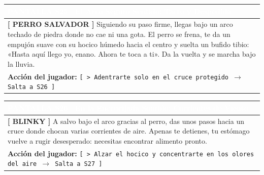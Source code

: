 \documentclass[11pt, a4paper]{article}
\begin{document}
\vspace{1em}

\noindent
\begin{tabularx}{\textwidth}{|X|}
\hline
\rowcolor{colorHeader}
\textbf{\textcolor{white}{PANTALLA S25 $\cdot$ El Arco Seguro}} \hfill \small\textcolor{white}{Sentido: Tacto y Despedida} \\ \hline
\rowcolor{colorTextoBox}
\textbf{\textcolor{colorEmisor}{[ PERRO SALVADOR ]}} \vspace{0.2em}\newline
Siguiendo su paso firme, llegas bajo un arco techado de piedra donde no cae ni una gota. El perro se frena, te da un empujón suave con su hocico húmedo hacia el centro y suelta un bufido tibio: «Hasta aquí llego yo, enano. Ahora te toca a ti». Da la vuelta y se marcha bajo la lluvia. \\ \hline
\rowcolor{colorBotonBox}
\textbf{Acción del jugador:} \newline
\texttt{[ > Adentrarte solo en el cruce protegido $\rightarrow$ Salta a S26 ]} \\ \hline
\end{tabularx}

\vspace{1em}

\noindent
\begin{tabularx}{\textwidth}{|X|}
\hline
\rowcolor{colorHeader}
\textbf{\textcolor{white}{PANTALLA S26 $\cdot$ En la Encrucijada}} \hfill \small\textcolor{white}{Sentido: Corrientes de Viento} \\ \hline
\rowcolor{colorTextoBox}
\textbf{\textcolor{colorEmisor}{[ BLINKY ]}} \vspace{0.2em}\newline
A salvo bajo el arco gracias al perro, das unos pasos hacia un cruce donde chocan varias corrientes de aire. Apenas te detienes, tu estómago vuelve a rugir desesperado: necesitas encontrar alimento pronto. \\ \hline
\rowcolor{colorBotonBox}
\textbf{Acción del jugador:} \newline
\texttt{[ > Alzar el hocico y concentrarte en los olores del aire $\rightarrow$ Salta a S27 ]} \\ \hline
\end{tabularx}

\newpage

\end{document}
